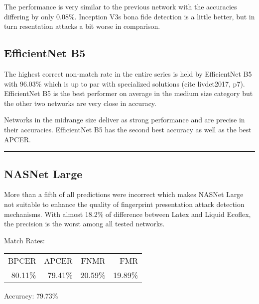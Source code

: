     The performance is very similar to the previous network with the accuracies differing by only 0.08\%.
    Inception V3s bona fide detection is a little better, but in turn resentation attacks a bit worse in comparison.




\subsection{EfficientNet B5}

    The highest correct non-match rate in the entire series is held by EfficientNet B5 with 96.03\% which is up to par with specialized solutions (cite livdet2017, p7).
    EfficientNet B5 is the best performer on average in the medium size category but the other two networks are very close in accuracy.

Networks in the midrange size deliver as strong performance and are precise in their accuracies.
EﬀicientNet B5 has the second best accuracy as well as the best APCER.

\bigskip\hrule


\subsection{NASNet Large}
\begin{minipage}[c]{0.7\textwidth}
    More than a fifth of all predictions were incorrect which makes NASNet Large not suitable to enhance the quality of fingerprint presentation attack detection mechanisms.
    With almost 18.2\% of difference between Latex and Liquid Ecoflex, the precision is the worst among all tested networks.

    \medskip\centering Match Rates: 
    \begin{tabular}{ r  r  r  r |}
        BPCER       & APCER      & FNMR     & FMR     \\
        80.11\%   & 79.41\%   & 20.59\%  & 19.89\%  \\
    \end{tabular} \hspace{2mm} Accuracy: 79.73\%
\end{minipage}
\hfill
\begin{minipage}[t]{0.3\textwidth}
    \centering
    
\end{minipage}



